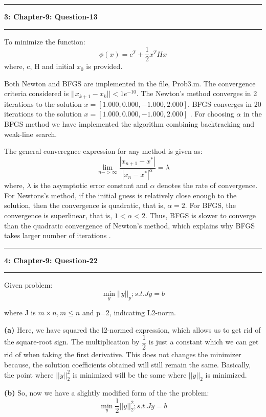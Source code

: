 \documentclass{article}
\newcommand\question[2]{\vspace{.25in}\hrule\textbf{#1: #2}\hrule\vspace{.10in}}
\renewcommand\part[1]{\vspace{.10in}\textbf{(#1)}}
\begin{document}
\question{3}{Chapter-9: Question-13}
To minimize the function:
\[ \phi(x) = c^T + \dfrac{1}{2}x^THx \]
where, c, H and initial $x_0$ is provided. \newline

Both Newton and BFGS are implemented in the file, Prob3.m. The convergence criteria considered is $||x_{k+1} - x_k|| < 1e^{-10}$. The Newton's method converges in 2 iterations to the solution $x = [1.000, 0.000, -1.000, 2.000]$. BFGS converges in 20 iterations to the solution $x = [1.000, 0.000, -1.000, 2.000]$ . For choosing $\alpha$ in the BFGS method we have implemented the algorithm combining backtracking and weak-line search.

The general converegnce expression for any method is given as:
\[ \lim_{n->\infty} \dfrac{|x_{n+1} - x^*|}{|x_n - x^*|^\alpha} = \lambda \]
where, $\lambda$ is the asymptotic error constant and $\alpha$ denotes the rate of convergence. For Newtons's method, if the initial guess is relatively close enough to the solution, then the convergence is quadratic, that is, $\alpha=2$. For BFGS, the convergence is superlinear, that is, $1 < \alpha < 2$. Thus, BFGS is slower to converge than the quadratic convergence of Newton's method, which explains why BFGS takes larger number of iterations . \newline


\question{4}{Chapter-9: Question-22}
Given problem:
\[ \min_{y} ||y||_p ; s.t. Jy=b\]

where J is $m \times n, m \leq n$ and p=2, indicating L2-norm. \newline

\part{a} Here, we have squared the l2-normed expression, which allows us to get rid of the square-root sign. The multiplication by $\dfrac{1}{2}$ is just a constant which we can get rid of when taking the first derivative. This does not changes the minimizer because, the solution coefficients obtained will still remain the same. Basically, the point where $||y||_2^2$ is minimized will be the same where $||y||_2$ is minimized. \newline

\part{b} So, now we have a slightly modified form of the the problem:
\[ \min_{y} \dfrac{1}{2}||y||_2^2 ; s.t. Jy = b \]
\end{document}

